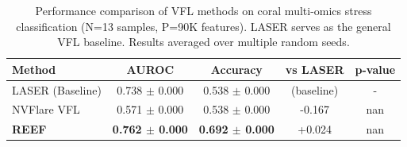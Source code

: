 
\begin{table}[h]
\centering
\caption{Performance comparison of VFL methods on coral multi-omics stress classification (N=13 samples, P=90K features). LASER serves as the general VFL baseline. Results averaged over multiple random seeds.}
\label{tab:vfl_comparison}
\begin{tabular}{lcccc}
\toprule
\textbf{Method} & \textbf{AUROC} & \textbf{Accuracy} & \textbf{vs LASER} & \textbf{p-value} \\
\midrule
LASER (Baseline) & 0.738 $\pm$ 0.000 & 0.538 $\pm$ 0.000 & (baseline) & - \\
NVFlare VFL & 0.571 $\pm$ 0.000 & 0.538 $\pm$ 0.000 & -0.167 & nan \\
\textbf{REEF} & \textbf{0.762 $\pm$ 0.000} & \textbf{0.692 $\pm$ 0.000} & +0.024 & nan \\

\bottomrule
\end{tabular}
\end{table}
